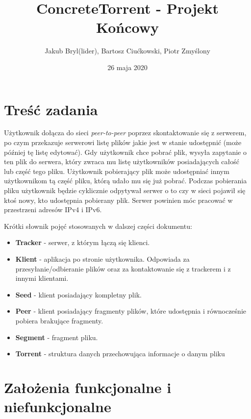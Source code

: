 \documentclass[11pt]{article}
\title{ConcreteTorrent - Projekt Końcowy}
\author{Jakub Bryl(lider), Bartosz Ciućkowski, Piotr Zmyślony}
\date{26 maja 2020} %
\begin{document}
	\maketitle
	\setcounter{secnumdepth}{3}
	\setcounter{tocdepth}{3}
	\tableofcontents
	\clearpage
\section{Treść zadania}
Użytkownik dołącza do sieci \textsl{peer-to-peer} poprzez skontaktowanie się z serwerem, po czym przekazuje serwerowi listę plików jakie jest w stanie udostępnić (może później tę listę edytować). Gdy użytkownik chce pobrać plik, wysyła zapytanie o ten plik do serwera, który zwraca mu listę użytkowników posiadających całość lub część tego pliku. Użytkownik pobierający plik może udostępniać innym użytkownikom tą część pliku, którą udało mu się już pobrać. Podczas pobierania pliku użytkownik będzie cyklicznie odpytywał serwer o to czy w sieci pojawił się ktoś nowy, kto udostępnia pobierany plik. Serwer powinien móc pracować w przestrzeni adresów IPv4 i IPv6.

Krótki słownik pojęć stosowanych w dalszej części dokumentu:
\begin{itemize}
\item \textbf{Tracker} - serwer, z którym łączą się klienci.
\item \textbf{Klient} - aplikacja po stronie użytkownika. Odpowiada za przesyłanie/odbieranie plików oraz za kontaktowanie się z trackerem i z innymi klientami.
\item \textbf{Seed} - klient posiadający kompletny plik.
\item \textbf{Peer} - klient posiadający fragmenty plików, które udostępnia i równocześnie pobiera brakujące fragmenty.
\item \textbf{Segment} - fragment pliku.
\item \textbf{Torrent} - struktura danych przechowująca informacje o danym pliku
\end{itemize}

\section{Założenia funkcjonalne i niefunkcjonalne}
\end{document}
